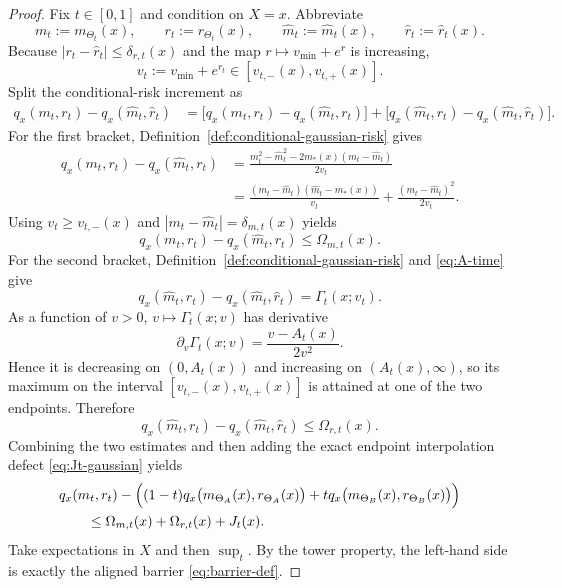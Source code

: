 \documentclass[11pt]{article}
\theoremstyle{definition}
\newcommand{\abs}[1]{\left\lvert #1 \right\rvert}
\begin{document}
\begin{proof}
Fix $t\in[0,1]$ and condition on $X=x$. Abbreviate
\[
  m_t:=m_{\Theta_t}(x),
  \qquad
  r_t:=r_{\Theta_t}(x),
  \qquad
  \hat m_t:=\hat m_t(x),
  \qquad
  \hat r_t:=\hat r_t(x).
\]
Because $\abs{r_t-\hat r_t}\le \delta_{r,t}(x)$ and the map
$r\mapsto v_{\min}+e^r$ is increasing,
\[
  v_t:=v_{\min}+e^{r_t}\in [v_{t,-}(x),v_{t,+}(x)].
\]
Split the conditional-risk increment as
\begin{align*}
  q_x(m_t,r_t)
  -
  q_x(\hat m_t,\hat r_t)
  &=
  \bigl[q_x(m_t,r_t)-q_x(\hat m_t,r_t)\bigr]
  +
  \bigl[q_x(\hat m_t,r_t)-q_x(\hat m_t,\hat r_t)\bigr].
\end{align*}
For the first bracket, Definition~\ref{def:conditional-gaussian-risk} gives
\begin{align*}
  q_x(m_t,r_t)-q_x(\hat m_t,r_t)
  &=
  \frac{m_t^2-\hat m_t^2-2m_\ast(x)(m_t-\hat m_t)}{2v_t}
  \\
  &=
  \frac{(m_t-\hat m_t)(\hat m_t-m_\ast(x))}{v_t}
  +
  \frac{(m_t-\hat m_t)^2}{2v_t}.
\end{align*}
Using $v_t\ge v_{t,-}(x)$ and
$\abs{m_t-\hat m_t}=\delta_{m,t}(x)$ yields
\[
  q_x(m_t,r_t)-q_x(\hat m_t,r_t)\le \Omega_{m,t}(x).
\]
For the second bracket, Definition~\ref{def:conditional-gaussian-risk} and
\eqref{eq:A-time} give
\[
  q_x(\hat m_t,r_t)-q_x(\hat m_t,\hat r_t)
  =
  \Gamma_t(x;v_t).
\]
As a function of $v>0$, $v\mapsto \Gamma_t(x;v)$ has derivative
\[
  \partial_v \Gamma_t(x;v)
  =
  \frac{v-A_t(x)}{2v^2}.
\]
Hence it is decreasing on $(0,A_t(x))$ and increasing on $(A_t(x),\infty)$, so
its maximum on the interval $[v_{t,-}(x),v_{t,+}(x)]$ is attained at one of the
two endpoints. Therefore
\[
  q_x(\hat m_t,r_t)-q_x(\hat m_t,\hat r_t)
  \le
  \Omega_{r,t}(x).
\]
Combining the two estimates and then adding the exact endpoint interpolation
defect \eqref{eq:Jt-gaussian} yields
\begin{align*}
  &q_x(m_t,r_t)
  -
  \Bigl(
    (1-t)q_x\bigl(m_{\Theta_A}(x),r_{\Theta_A}(x)\bigr)
    +
    t q_x\bigl(m_{\Theta_B}(x),r_{\Theta_B}(x)\bigr)
  \Bigr)
  \\
  &\qquad\le
  \Omega_{m,t}(x)+\Omega_{r,t}(x)+J_t(x).
\end{align*}
Take expectations in $X$ and then $\sup_t$. By the tower property, the left-hand
side is exactly the aligned barrier \eqref{eq:barrier-def}.
\end{proof}
\end{document}
